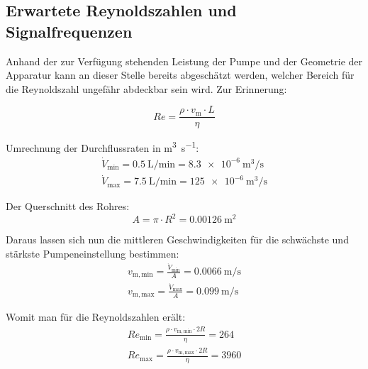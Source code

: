 \clearpage
\subsection{Erwartete Reynoldszahlen und Signalfrequenzen}
\label{subsec:expectations}

Anhand der zur Verf\"ugung stehenden Leistung  der Pumpe und der Geometrie der
Apparatur kann an dieser Stelle  bereits abgesch\"atzt werden, welcher Bereich
f\"ur die Reynoldszahl ungef\"ahr abdeckbar sein wird. Zur Erinnerung:

\begin{equation}
    \label{eq:reynolds1}
    \mathit{Re} = \frac{\rho \cdot v_{\mathrm{m}} \cdot L}{\eta}
\end{equation}

Umrechnung der Durchflussraten in \si{\cubic\meter\per\second}:
\begin{align}
    \label{eq:Q:siconform}
    \dot{V}_{\mathrm{min}} = \SI{0.5}{\liter\per\minute} = \SI{8.3e-6}{\cubic\meter\per\second}
    \\
    \dot{V}_{\mathrm{max}} = \SI{7.5}{\liter\per\minute} = \SI{125e-6}{\cubic\meter\per\second}
\end{align}

Der Querschnitt des Rohres:
\begin{equation}
    \label{eq:cross_section}
    A = \pi \cdot R^2 = \SI{0.00126}{\meter\squared}
\end{equation}

Daraus lassen sich nun die mittleren Geschwindigkeiten f\"ur die schw\"achste
und st\"arkste Pumpeneinstellung bestimmen:
\begin{align}
    \label{eq:min_max_speed}
    v_{\mathrm{m,min}} = \frac{\dot{V}_{\mathrm{min}}}{A} = \SI{0.0066}{\meter\per\second}
    \\
    v_{\mathrm{m,max}} = \frac{\dot{V}_{\mathrm{max}}}{A} = \SI{0.099}{\meter\per\second}
\end{align}

Womit man f\"ur die Reynoldszahlen er\"alt:
\begin{align}
    \label{eq:reynolds:range}
    Re_{\mathrm{min}} = \frac{\rho \cdot v_{\mathrm{m,min}} \cdot 2R}{\eta} = 264
    \\
    Re_{\mathrm{max}} = \frac{\rho \cdot v_{\mathrm{m,max}} \cdot 2R}{\eta} = 3960
\end{align}

